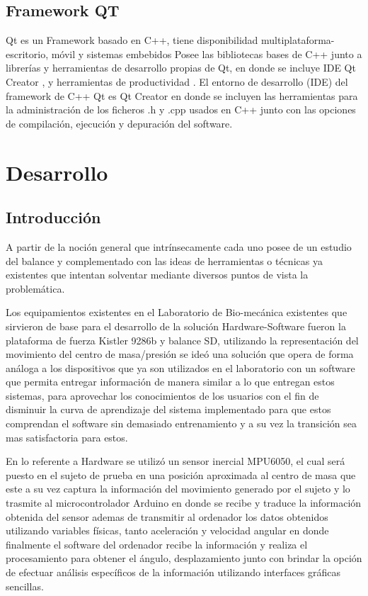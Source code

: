 \documentclass[12pt,a4paper]{article}
\let\stdsection\section
\renewcommand\section{\newpage\stdsection}
\begin{document}
 
\subsection{Framework QT}
Qt es un Framework basado en C++, tiene disponibilidad multiplataforma- escritorio, móvil y sistemas embebidos
Posee las bibliotecas bases de C++  junto a librerías y herramientas de desarrollo propias de Qt, en donde se incluye IDE Qt Creator , y herramientas de productividad .
	El entorno de desarrollo (IDE) del framework de C++ Qt  es Qt Creator en donde se incluyen las herramientas para la administración de los ficheros .h y .cpp usados en C++ junto con las opciones de compilación, ejecución y depuración del software.


\section{Desarrollo}
\subsection{Introducción}

A partir de la noción general que intrínsecamente cada uno posee de un estudio del balance y complementado con las ideas de herramientas o técnicas ya existentes que intentan solventar mediante diversos puntos de vista la problemática.

Los equipamientos existentes en el Laboratorio de Bio-mecánica existentes que sirvieron de base para el desarrollo de la solución Hardware-Software  fueron la plataforma de fuerza Kistler 9286b \cite{KISTLER} y balance SD, utilizando la representación del movimiento del centro de masa/presión se ideó una solución que opera de forma análoga a los dispositivos que ya son utilizados en el laboratorio con un software que permita entregar información de manera similar a lo que entregan estos sistemas, para aprovechar los conocimientos de los usuarios con el fin de disminuir la curva de aprendizaje del sistema implementado para que estos comprendan el software sin demasiado entrenamiento y a su vez la transición sea mas satisfactoria para estos.

En lo referente a Hardware se utilizó un sensor inercial MPU6050, el cual será puesto en el sujeto de prueba en una posición aproximada al centro de masa que este a su vez captura la información del movimiento generado por el sujeto y lo trasmite al microcontrolador Arduino en donde se recibe y traduce la información obtenida del sensor ademas de transmitir al ordenador los datos obtenidos utilizando variables físicas, tanto aceleración y velocidad angular en donde finalmente el software del ordenador recibe la información y realiza el procesamiento para obtener el ángulo, desplazamiento junto con brindar la opción de efectuar análisis específicos de la información utilizando interfaces gráficas sencillas.
\end{document}
